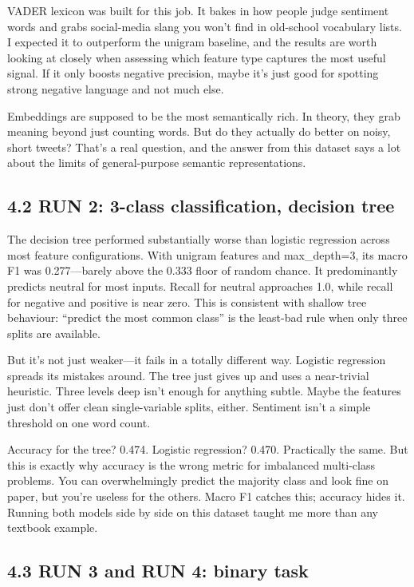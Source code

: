 \documentclass[12pt]{article}
\begin{document}
VADER lexicon was built for this job. It bakes in how people judge sentiment words and grabs social-media slang you won't find in old-school vocabulary lists. I expected it to outperform the unigram baseline, and the results are worth looking at closely when assessing which feature type captures the most useful signal. If it only boosts negative precision, maybe it's just good for spotting strong negative language and not much else.

Embeddings are supposed to be the most semantically rich. In theory, they grab meaning beyond just counting words. But do they actually do better on noisy, short tweets? That's a real question, and the answer from this dataset says a lot about the limits of general-purpose semantic representations.



\subsection*{4.2 RUN 2: 3-class classification, decision tree}



The decision tree performed substantially worse than logistic regression across most feature configurations. With unigram features and max\_depth=3, its macro F1 was 0.277---barely above the 0.333 floor of random chance. It predominantly predicts neutral for most inputs. Recall for neutral approaches 1.0, while recall for negative and positive is near zero. This is consistent with shallow tree behaviour: ``predict the most common class'' is the least-bad rule when only three splits are available.

But it's not just weaker---it fails in a totally different way. Logistic regression spreads its mistakes around. The tree just gives up and uses a near-trivial heuristic. Three levels deep isn't enough for anything subtle. Maybe the features just don't offer clean single-variable splits, either. Sentiment isn't a simple threshold on one word count.

Accuracy for the tree? 0.474. Logistic regression? 0.470. Practically the same. But this is exactly why accuracy is the wrong metric for imbalanced multi-class problems. You can overwhelmingly predict the majority class and look fine on paper, but you're useless for the others. Macro F1 catches this; accuracy hides it. Running both models side by side on this dataset taught me more than any textbook example.



\subsection*{4.3 RUN 3 and RUN 4: binary task}
\end{document}
